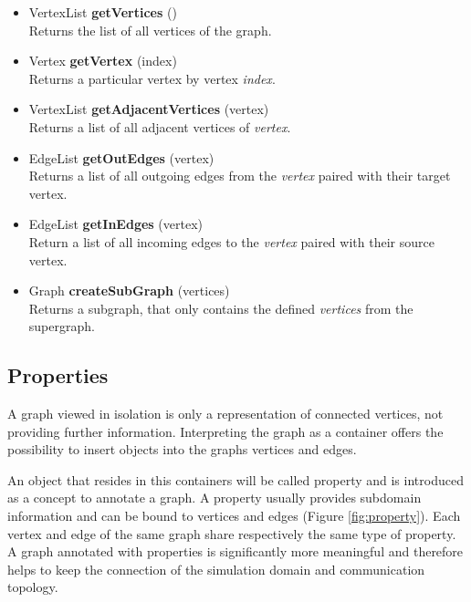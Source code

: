 \begin{itemize}
  \item VertexList \textbf{getVertices} ()\\
    Returns the list of all vertices of the graph.
    
  \item  Vertex \textbf{getVertex} (index)\\
    Returns a particular vertex by vertex \textit{index}.

  \item  VertexList \textbf{getAdjacentVertices} (vertex)\\
    Returns a list of all adjacent vertices of \textit{vertex}.

  \item  EdgeList \textbf{getOutEdges} (vertex)\\
    Returns a list of all outgoing edges from the \textit{vertex}
    paired with their target vertex.

  \item  EdgeList \textbf{getInEdges} (vertex)\\
    Return a list of all incoming edges to the \textit{vertex}
    paired with their source vertex.

  \item  Graph \textbf{createSubGraph} (vertices)\\
    Returns a subgraph, that only contains the defined
    \textit{vertices} from the supergraph.
\end{itemize}

\subsection{Properties}
A graph viewed in isolation is only a representation of connected
vertices, not providing further information. Interpreting the graph as
a container offers the possibility to insert objects into the graphs
vertices and edges.

An object that resides in this containers will be called property and
is introduced as a concept to annotate a graph. A property usually
provides subdomain information and can be bound to vertices and edges
(Figure \ref{fig:property}). Each vertex and edge of the same graph
share respectively the same type of property. A graph annotated with
properties is significantly more meaningful and therefore helps to
keep the connection of the simulation domain and communication
topology.

